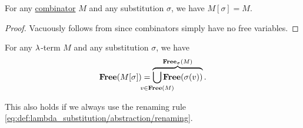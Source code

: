 \begin{corollary}\label{thm:lambda_substitution_combinators}
  For any \hyperref[def:lambda_combinator]{combinator} \( M \) and any substitution \( \sigma \), we have \( M[\sigma] = M \).
\end{corollary}
\begin{proof}
  Vacuously follows from  since combinators simply have no free variables.
\end{proof}

\begin{proposition}\label{thm:lambda_substitution_free_variables}
  For any \( \mathrm{\lambda} \)-term \( M \) and any substitution \( \sigma \), we have
  \begin{equation}\label{eq:thm:lambda_substitution_free_variables}
    \op*{Free}( M[\sigma] ) = \overbrace{\bigcup_{\mathclap{v \in \op*{Free}(M)}} \op*{Free}(\sigma(v))}^{\op*{Free}_\sigma(M)}.
  \end{equation}

  This also holds if we always use the renaming rule \eqref{eq:def:lambda_substitution/abstraction/renaming}.
\end{proposition}
